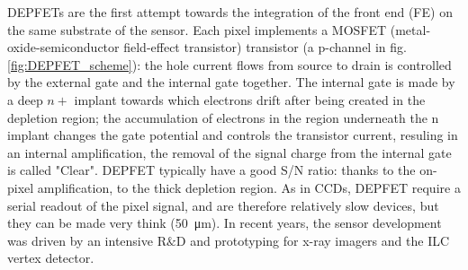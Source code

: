    DEPFETs are the first attempt towards the integration of the front end (FE) on the same substrate of the sensor.
   Each pixel implements a MOSFET (metal-oxide-semiconductor field-effect transistor) transistor (a p-channel in fig. \ref{fig:DEPFET_scheme}): the hole current flows from source to drain is controlled by the external gate and the internal gate together. The internal gate is made by a deep $n+$ implant towards which electrons drift after being created in the depletion region; the accumulation of electrons in the region underneath the n implant changes the gate potential and controls the transistor current, resuling in an internal amplification, the removal of the signal charge from the internal gate is called "Clear". 
   DEPFET typically have a good S/N ratio: thanks to the on-pixel amplification, to the thick depletion region. 
   As in CCDs, DEPFET require a serial readout of the pixel signal, and are therefore relatively slow devices, but they can be made very think (\SI{50}{\um}).
   In recent years, the sensor development was driven by an intensive R$\&$D and prototyping for x-ray imagers and the ILC vertex detector. 
   

